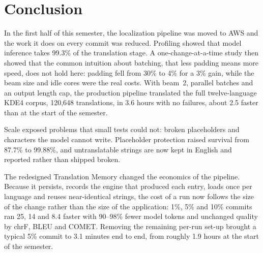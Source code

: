 \section{Conclusion}
\label{sec:conclusion}

In the first half of this semester, the localization pipeline was moved to AWS and the work it does on every commit was
reduced. Profiling showed that
model inference takes 99.3\% of the translation stage. A one-change-at-a-time study then showed that the common intuition
about batching, that less padding means more speed, does not hold here: padding fell from 30\% to 4\% for a 3\% gain,
while the beam size and idle cores were the real costs. With beam~2, parallel batches and an output length cap, the
production pipeline translated the full twelve-language KDE4 corpus, 120,648 translations, in 3.6 hours with no failures,
about 2.5\x{} faster than at the start of the semester.

Scale exposed problems that small tests could not: broken placeholders and characters the model cannot write. Placeholder
protection raised survival from 87.7\% to 99.88\%, and untranslatable strings are now kept in English and reported rather
than shipped broken.

The redesigned Translation Memory changed the economics of the pipeline. Because it persists, records the engine that
produced each entry, loads once per language and reuses near-identical strings, the cost of a run now follows the size of
the change rather than the size of the application: 1\%, 5\% and 10\% commits ran 25\x{}, 14\x{} and 8.4\x{} faster with
90--98\% fewer model tokens and unchanged quality by chrF, BLEU and COMET. Removing the remaining per-run set-up brought a typical 5\% commit to
3.1 minutes end to end, from roughly 1.9 hours at the start of the semester.
